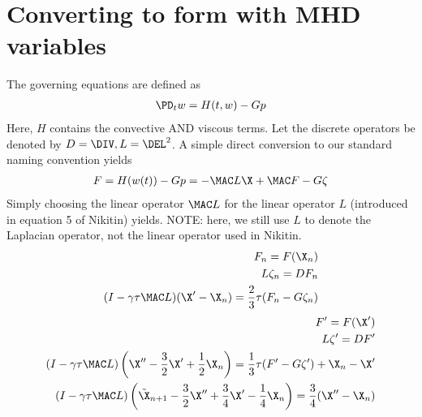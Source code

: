 \documentclass[11pt]{article}
\begin{document}
\newpage
\section{Converting to form with MHD variables} \label{sec:MHD_form}
The governing equations are defined as
\begin{equation}\begin{aligned}
  \PD_t w = H(t,w) - G p \\
\end{aligned}\end{equation}
Here, $H$ contains the convective AND viscous terms. Let the discrete operators be denoted by $D = \DIV, L = \DEL^2$. A simple direct conversion to our standard naming convention yields
\begin{equation}\begin{aligned}
  F = H(w(t)) - G p = - \MAC L \X + \MAC F - G \zeta \\
\end{aligned}\end{equation}
Simply choosing the linear operator $\MAC L$ for the linear operator $L$ (introduced in equation 5 of Nikitin) yields. NOTE: here, we still use $L$ to denote the Laplacian operator, not the linear operator used in Nikitin.
\begin{equation}\begin{aligned}
  F_n = F(\X_n) \\
  L \zeta_n = D F_n \\
  (I - \gamma \tau \MAC L) (\X' - \X_n) = \frac{2}{3} \tau (F_n - G \zeta_n) \\
\end{aligned}\end{equation}
\begin{equation}\begin{aligned}
  F' = F(\X') \\
  L \zeta' = D F' \\
  (I - \gamma \tau \MAC L) \left(\X'' - \frac{3}{2}\X' + \frac{1}{2} \X_n \right) = \frac{1}{3} \tau (F' - G \zeta') + \X_n - \X' \\
  (I - \gamma \tau \MAC L) \left(\tilde{\X}_{n+1} - \frac{3}{2}\X'' + \frac{3}{4} \X' - \frac{1}{4}\X_n\right) = \frac{3}{4} (\X'' - \X_n) \\
\end{aligned}\end{equation}
\end{document}
